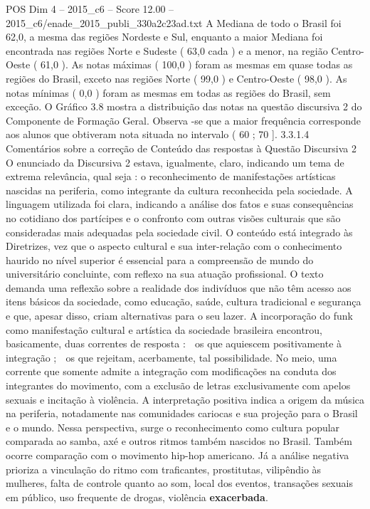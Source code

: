 \begin{textsample}{POS Dim 4 – 2015\_c6 – Score 12.00 – 2015\_c6/enade\_2015\_publi\_330a2c23ad.txt}
A Mediana de todo o Brasil foi 62,0, a mesma das regiões Nordeste e Sul, enquanto a maior Mediana foi encontrada nas regiões Norte e Sudeste ( 63,0 cada ) e a menor, na região Centro-Oeste ( 61,0 ).
As notas máximas ( 100,0 ) foram as mesmas em quase todas as regiões do Brasil, exceto nas regiões Norte ( 99,0 ) e Centro-Oeste ( 98,0 ).
As notas mínimas ( 0,0 ) foram as mesmas em todas as regiões do Brasil, sem exceção.
O Gráfico 3.8 mostra a distribuição das notas na questão discursiva 2 do Componente de Formação Geral.
Observa -se que a maior frequência corresponde aos alunos que obtiveram nota situada no intervalo ( 60 ; 70 ]. 3.3.1.4 Comentários sobre a correção de Conteúdo das respostas à Questão Discursiva 2 O enunciado da Discursiva 2 estava, igualmente, claro, indicando um tema de extrema relevância, qual seja : o reconhecimento de manifestações artísticas nascidas na periferia, como integrante da cultura reconhecida pela sociedade.
A linguagem utilizada foi clara, indicando a análise dos fatos e suas consequências no cotidiano dos partícipes e o confronto com outras visões culturais que são consideradas mais adequadas pela sociedade civil.
O conteúdo está integrado às Diretrizes, vez que o aspecto cultural e sua inter-relação com o conhecimento haurido no nível superior é essencial para a compreensão de mundo do universitário concluinte, com reflexo na sua atuação profissional.
O texto demanda uma reflexão sobre a realidade dos indivíduos que não têm acesso aos itens básicos da sociedade, como educação, saúde, cultura tradicional e segurança e que, apesar disso, criam alternativas para o seu lazer.
A incorporação do funk como manifestação cultural e artística da sociedade brasileira encontrou, basicamente, duas correntes de resposta :  os que aquiescem positivamente à integração ;  os que rejeitam, acerbamente, tal possibilidade.
No meio, uma corrente que somente admite a integração com modificações na conduta dos integrantes do movimento, com a exclusão de letras exclusivamente com apelos sexuais e incitação à violência.
A interpretação positiva indica a origem da música na periferia, notadamente nas comunidades cariocas e sua projeção para o Brasil e o mundo.
Nessa perspectiva, surge o reconhecimento como cultura popular comparada ao samba, axé e outros ritmos também nascidos no Brasil.
Também ocorre comparação com o movimento hip-hop americano.
Já a análise negativa prioriza a vinculação do ritmo com traficantes, prostitutas, vilipêndio às mulheres, falta de controle quanto ao som, local dos eventos, transações sexuais em público, uso frequente de drogas, violência \textbf{exacerbada}.

\end{textsample}
